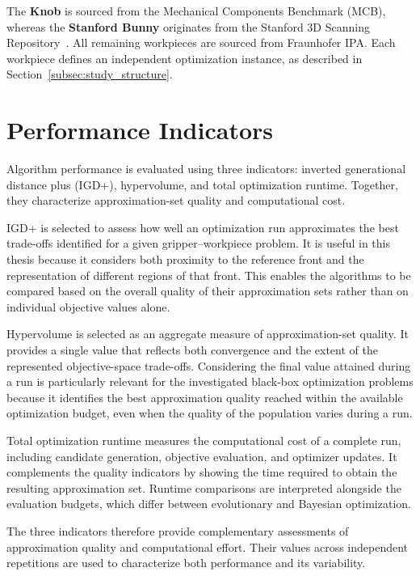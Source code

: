 The \textbf{Knob} is sourced from the Mechanical Components Benchmark
(MCB), whereas the \textbf{Stanford Bunny} originates from
the Stanford 3D Scanning Repository~\cite{sangpil2020large, turk1994zippered}. All remaining
workpieces are sourced from Fraunhofer IPA. Each workpiece defines an independent optimization instance, as described
in Section~\ref{subsec:study_structure}.

\section{Performance Indicators}
\label{sec:methodology_performance_indicators}

Algorithm performance is evaluated using three indicators: inverted
generational distance plus (IGD+), hypervolume, and total optimization
runtime. Together, they characterize approximation-set quality and
computational cost.

IGD+ is selected to assess how well an optimization run approximates the best trade-offs identified for a given gripper--workpiece problem. It is
useful in this thesis because it considers both proximity to the reference front and the representation of different regions of that front. This
enables the algorithms to be compared based on the overall quality of their approximation sets rather than on individual objective values alone.

Hypervolume is selected as an aggregate measure of approximation-set quality. It provides a single value that reflects both convergence and
the extent of the represented objective-space trade-offs. Considering the final value attained during a run is particularly relevant for the
investigated black-box optimization problems because it identifies the best approximation quality reached within the available optimization budget,
even when the quality of the population varies during a run.

Total optimization runtime measures the computational cost of a complete
run, including candidate generation, objective evaluation, and optimizer
updates. It complements the quality indicators by showing the time
required to obtain the resulting approximation set. Runtime comparisons
are interpreted alongside the evaluation budgets, which differ between
evolutionary and Bayesian optimization.

The three indicators therefore provide complementary assessments of
approximation quality and computational effort. Their values across
independent repetitions are used to characterize both performance and
its variability.


